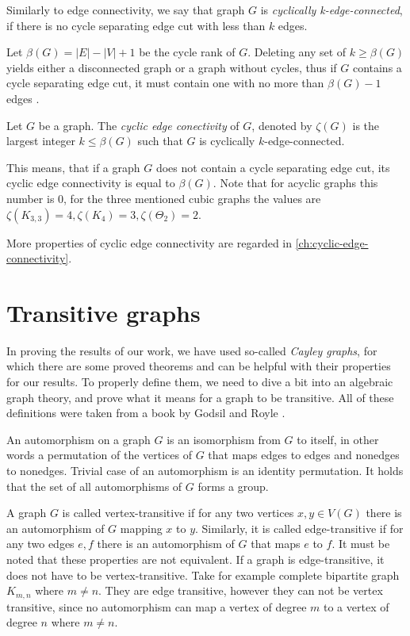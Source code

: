 \documentclass[12pt, twoside]{book}
\begin{document}
Similarly to edge connectivity, we say that graph $G$ is \textit{cyclically k-edge-connected}, if there is no cycle separating edge cut with less than $k$ edges.

Let $\beta(G)=|E|-|V|+1$ be the cycle rank of $G$. Deleting any set of $k\geq \beta(G)$ yields either a disconnected graph or a graph without cycles, thus if $G$ contains a cycle separating edge cut, it must contain one with no more than $\beta(G)-1$ edges \cite{atoms-of-cyclic}.

\begin{definition}
	Let $G$ be a graph. The \textit{cyclic edge conectivity} of $G$, denoted by $\zeta(G)$ is the largest integer $k \leq \beta(G)$ such that $G$ is cyclically $k$-edge-connected.
\end{definition}

This means, that if a graph $G$ does not contain a cycle separating edge cut, its cyclic edge connectivity is equal to $\beta(G)$. Note that for acyclic graphs this number is 0, for the three mentioned cubic graphs the values are $\zeta(K_{3,3})=4, \zeta(K_4)=3, \zeta(\Theta_2)=2$.

More properties of cyclic edge connectivity are regarded in \cref{ch:cyclic-edge-connectivity}.

\section{Transitive graphs}\label{sec:transitive-graphs}

In proving the results of our work, we have used so-called \textit{Cayley graphs}, for which there are some proved theorems and can be helpful with their properties for our results. To properly define them, we need to dive a bit into an algebraic graph theory, and prove what it means for a graph to be transitive. All of these definitions were taken from a book by Godsil and Royle \cite{algebraic-graph-theory}.

An automorphism on a graph $G$ is an isomorphism from $G$ to itself, in other words a permutation of the vertices of $G$ that maps edges to edges and nonedges to nonedges. Trivial case of an automorphism is an identity permutation. It holds that the set of all automorphisms of $G$ forms a group.

A graph $G$ is called vertex-transitive if for any two vertices $x,y\in V(G)$ there is an automorphism of $G$ mapping $x$ to $y$. Similarly, it is called edge-transitive if for any two edges $e,f$ there is an automorphism of $G$ that maps $e$ to $f$. It must be noted that these properties are not equivalent. If a graph is edge-transitive, it does not have to be vertex-transitive. Take for example complete bipartite graph $K_{m,n}$ where $m\neq n$. They are edge transitive, however they can not be vertex transitive, since no automorphism can map a vertex of degree $m$ to a vertex of degree $n$ where $m\neq n$.
\end{document}
